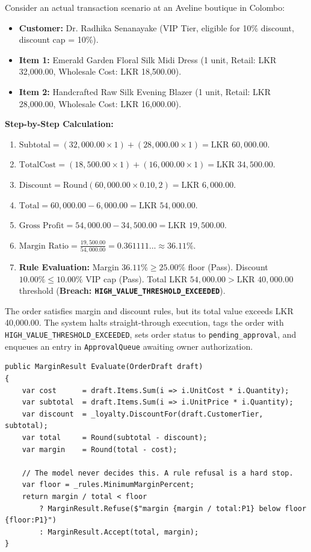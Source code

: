 Consider an actual transaction scenario at an Aveline boutique in Colombo:
\begin{itemize}
    \item \textbf{Customer:} Dr. Radhika Senanayake (VIP Tier, eligible for 10\% discount, discount cap = 10\%).
    \item \textbf{Item 1:} Emerald Garden Floral Silk Midi Dress (1 unit, Retail: LKR 32,000.00, Wholesale Cost: LKR 18,500.00).
    \item \textbf{Item 2:} Handcrafted Raw Silk Evening Blazer (1 unit, Retail: LKR 28,000.00, Wholesale Cost: LKR 16,000.00).
\end{itemize}

\textbf{Step-by-Step Calculation:}
\begin{enumerate}
    \item $\text{Subtotal} = (32,000.00 \times 1) + (28,000.00 \times 1) = \text{LKR } 60,000.00$.
    \item $\text{TotalCost} = (18,500.00 \times 1) + (16,000.00 \times 1) = \text{LKR } 34,500.00$.
    \item $\text{Discount} = \text{Round}(60,000.00 \times 0.10, 2) = \text{LKR } 6,000.00$.
    \item $\text{Total} = 60,000.00 - 6,000.00 = \text{LKR } 54,000.00$.
    \item $\text{Gross Profit} = 54,000.00 - 34,500.00 = \text{LKR } 19,500.00$.
    \item $\text{Margin Ratio} = \frac{19,500.00}{54,000.00} = 0.361111... \approx 36.11\%$.
    \item \textbf{Rule Evaluation:} Margin $36.11\% \ge 25.00\%$ floor (Pass). Discount $10.00\% \le 10.00\%$ VIP cap (Pass). Total LKR $54,000.00 > \text{LKR } 40,000.00$ threshold (\textbf{Breach: \texttt{HIGH\_VALUE\_THRESHOLD\_EXCEEDED}}).
\end{enumerate}

The order satisfies margin and discount rules, but its total value exceeds LKR 40,000.00. The system halts straight-through execution, tags the order with \texttt{HIGH\_VALUE\_THRESHOLD\_EXCEEDED}, sets order status to \texttt{pending\_approval}, and enqueues an entry in \texttt{ApprovalQueue} awaiting owner authorization.

\begin{lstlisting}[language={[Sharp]C},caption={Margin evaluation is deterministic (\texttt{lst:margin})},label={lst:margin}]
public MarginResult Evaluate(OrderDraft draft)
{
    var cost      = draft.Items.Sum(i => i.UnitCost * i.Quantity);
    var subtotal  = draft.Items.Sum(i => i.UnitPrice * i.Quantity);
    var discount  = _loyalty.DiscountFor(draft.CustomerTier, subtotal);
    var total     = Round(subtotal - discount);
    var margin    = Round(total - cost);

    // The model never decides this. A rule refusal is a hard stop.
    var floor = _rules.MinimumMarginPercent;
    return margin / total < floor
        ? MarginResult.Refuse($"margin {margin / total:P1} below floor {floor:P1}")
        : MarginResult.Accept(total, margin);
}
\end{lstlisting}

